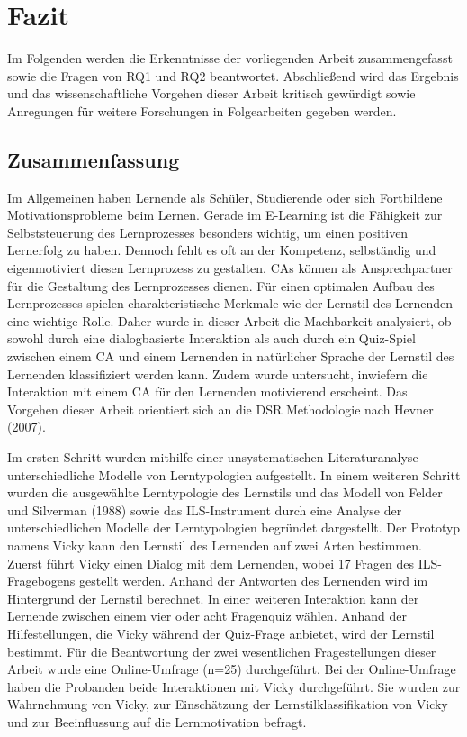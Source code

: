 \chapter{Fazit}
Im Folgenden werden die Erkenntnisse der vorliegenden Arbeit zusammengefasst sowie die Fragen von RQ1 und RQ2
beantwortet. Abschließend wird das Ergebnis und das wissenschaftliche Vorgehen dieser Arbeit kritisch gewürdigt sowie Anregungen für 
weitere Forschungen in Folgearbeiten gegeben werden. 
\section{Zusammenfassung}

Im Allgemeinen haben Lernende als Schüler, Studierende oder sich Fortbildene Motivationsprobleme 
beim Lernen. Gerade im E-Learning ist die Fähigkeit zur Selbststeuerung des Lernprozesses besonders wichtig,
um einen positiven Lernerfolg zu haben. Dennoch fehlt es oft an der Kompetenz, selbständig und 
eigenmotiviert diesen Lernprozess zu gestalten.
CAs können als Ansprechpartner für die Gestaltung des Lernprozesses dienen.
Für einen optimalen Aufbau des Lernprozesses spielen charakteristische Merkmale wie der
Lernstil des Lernenden eine wichtige Rolle. Daher wurde in dieser Arbeit
die Machbarkeit analysiert, ob sowohl durch eine dialogbasierte Interaktion als auch durch ein Quiz-Spiel zwischen einem CA 
und einem Lernenden in natürlicher Sprache der Lernstil des Lernenden klassifiziert werden kann.
Zudem wurde untersucht, inwiefern die Interaktion mit einem CA für den Lernenden motivierend erscheint.
Das Vorgehen dieser Arbeit orientiert sich an die DSR Methodologie nach Hevner (2007).

Im ersten Schritt wurden mithilfe einer unsystematischen Literaturanalyse unterschiedliche Modelle von Lerntypologien
aufgestellt. In einem weiteren Schritt wurden die ausgewählte Lerntypologie des Lernstils und das Modell 
von Felder und Silverman (1988) sowie das ILS-Instrument durch eine Analyse der unterschiedlichen Modelle der Lerntypologien begründet dargestellt.
Der Prototyp namens Vicky kann den Lernstil des Lernenden auf zwei Arten bestimmen.
Zuerst führt Vicky einen Dialog mit dem Lernenden, wobei 17 Fragen des ILS-Fragebogens gestellt werden.
Anhand der Antworten des Lernenden wird im Hintergrund der Lernstil berechnet. In einer weiteren Interaktion
kann der Lernende zwischen einem vier oder acht Fragenquiz wählen. Anhand der Hilfestellungen, die Vicky während 
der Quiz-Frage anbietet, wird der Lernstil bestimmt. Für die Beantwortung der zwei wesentlichen Fragestellungen 
dieser Arbeit wurde eine Online-Umfrage (n=25) durchgeführt. Bei der Online-Umfrage haben die Probanden beide 
Interaktionen mit Vicky durchgeführt. Sie wurden zur Wahrnehmung von Vicky, zur Einschätzung der Lernstilklassifikation 
von Vicky und zur Beeinflussung auf die Lernmotivation befragt.

